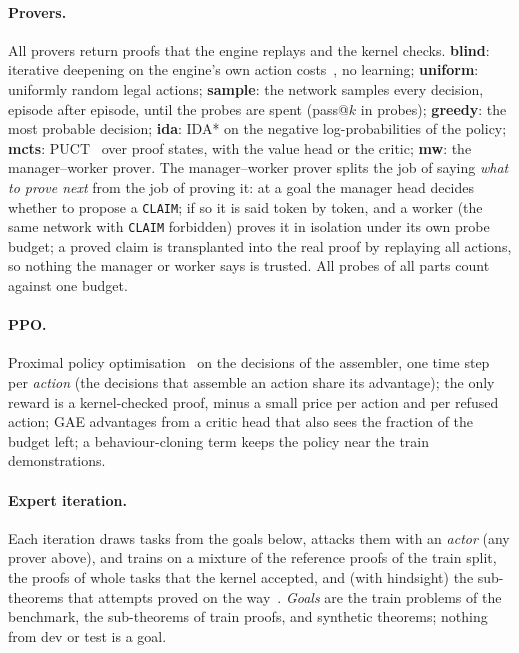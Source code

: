 \documentclass[10pt]{article}
\newcommand{\code}[1]{\texttt{#1}}
\begin{document}
\paragraph{Provers.}
All provers return proofs that the engine replays and the kernel checks.
\textbf{blind}: iterative deepening on the engine's own action costs~\citep{korf1985depth}, no learning; \textbf{uniform}: uniformly random legal actions; \textbf{sample}: the network samples every decision, episode after episode, until the probes are spent (pass@$k$ in probes); \textbf{greedy}: the most probable decision; \textbf{ida}: IDA* on the negative log-probabilities of the policy; \textbf{mcts}: PUCT~\citep{kocsis2006bandit,silver2017mastering} over proof states, with the value head or the critic; \textbf{mw}: the manager--worker prover.
The manager--worker prover splits the job of saying \emph{what to prove next} from the job of proving it: at a goal the manager head decides whether to propose a \code{CLAIM}; if so it is said token by token, and a worker (the same network with \code{CLAIM} forbidden) proves it in isolation under its own probe budget; a proved claim is transplanted into the real proof by replaying all actions, so nothing the manager or worker says is trusted. All probes of all parts count against one budget.

\paragraph{PPO.}
Proximal policy optimisation~\citep{schulman2017ppo} on the decisions of the assembler, one time step per \emph{action} (the decisions that assemble an action share its advantage); the only reward is a kernel-checked proof, minus a small price per action and per refused action; GAE advantages from a critic head that also sees the fraction of the budget left; a behaviour-cloning term keeps the policy near the train demonstrations.

\paragraph{Expert iteration.}
Each iteration draws tasks from the goals below, attacks them with an \emph{actor} (any prover above), and trains on a mixture of the reference proofs of the train split, the proofs of whole tasks that the kernel accepted, and (with hindsight) the sub-theorems that attempts proved on the way~\citep{anthony2017thinking}.
\emph{Goals} are the train problems of the benchmark, the sub-theorems of train proofs, and synthetic theorems; nothing from dev or test is a goal.
\end{document}
